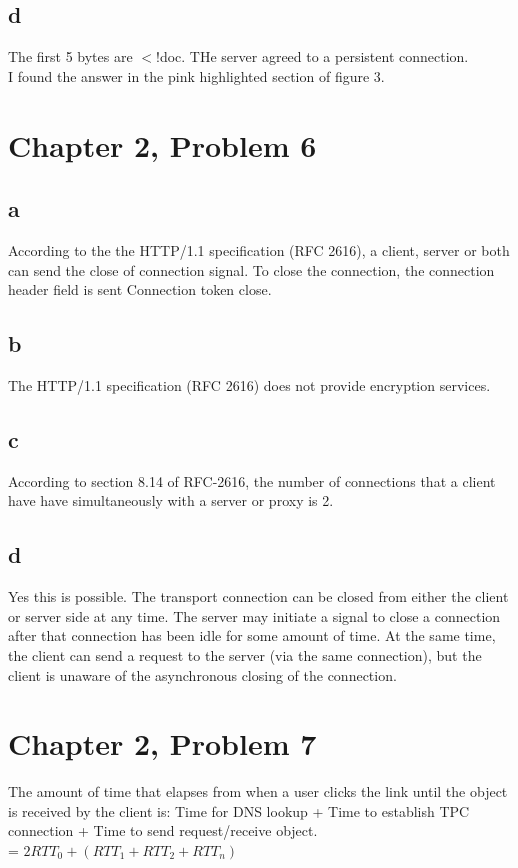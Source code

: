 \documentclass{article}
\begin{document}
\subsection{d}
The first 5 bytes are $<$!doc.  THe server agreed to a persistent connection.\\
\newline I found the answer in the pink highlighted section of figure 3.\\

\section{Chapter 2, Problem 6}
\subsection{a}
According to the the HTTP/1.1 specification (RFC 2616), a client, server or both can send the close of connection signal.  To close the connection, the connection header field is sent Connection token close.\\

\subsection{b}
The HTTP/1.1 specification (RFC 2616) does not provide encryption services.\\

\subsection{c}
According to section 8.14 of RFC-2616, the number of connections that a client have have simultaneously with a server or proxy is 2.\\

\subsection{d}
Yes this is possible.  The transport connection can be closed from either the client or server side at any time.  The server may initiate a signal to close a connection after that connection has been idle for some amount of time.  At the same time, the client can send a request to the server (via the same connection), but the client is unaware of the asynchronous closing of the connection.\\

\section{Chapter 2, Problem 7}
The amount of time that elapses from when a user clicks the link until the object is received by the client is: Time for DNS lookup + Time to establish TPC connection + Time to send request/receive object.\\
\newline = $2RTT_0 + (RTT_1 + RTT_2 + RTT_n)$\\
\end{document}
